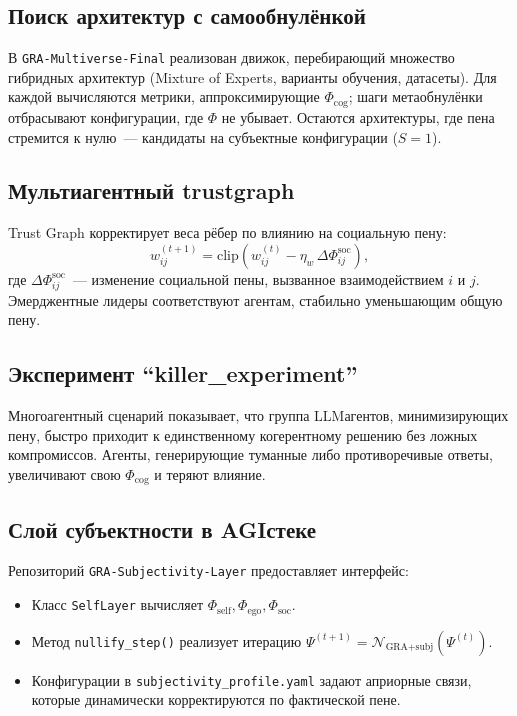 \documentclass[11pt,a4paper]{article}
\begin{document}
\subsection{Поиск архитектур с самообнулёнкой}

В \texttt{GRA-Multiverse-Final} реализован движок, перебирающий множество гибридных архитектур (Mixture of Experts, варианты обучения, датасеты).
Для каждой вычисляются метрики, аппроксимирующие $\Phi_{\text{cog}}$; шаги мета\textendash обнулёнки отбрасывают конфигурации, где $\Phi$ не убывает.
Остаются архитектуры, где пена стремится к нулю~--- кандидаты на субъектные конфигурации ($S=1$).

\subsection{Мультиагентный trust\textendash graph}

Trust Graph корректирует веса рёбер по влиянию на социальную пену:
\begin{equation}
w_{ij}^{(t+1)} = \text{clip}\left(w_{ij}^{(t)} - \eta_w\,\Delta\Phi^{\text{soc}}_{ij}\right),
\end{equation}
где $\Delta\Phi^{\text{soc}}_{ij}$~--- изменение социальной пены, вызванное взаимодействием $i$ и $j$.
Эмерджентные лидеры соответствуют агентам, стабильно уменьшающим общую пену.

\subsection{Эксперимент ``killer\_experiment''}

Многоагентный сценарий показывает, что группа LLM\textendash агентов, минимизирующих пену, быстро приходит к единственному когерентному решению без ложных компромиссов.
Агенты, генерирующие туманные либо противоречивые ответы, увеличивают свою $\Phi_{\text{cog}}$ и теряют влияние.

\subsection{Слой субъектности в AGI\textendash стеке}

Репозиторий \texttt{GRA-Subjectivity-Layer} предоставляет интерфейс:
\begin{itemize}
\item Класс \texttt{SelfLayer} вычисляет $\Phi_{\text{self}}, \Phi_{\text{ego}}, \Phi_{\text{soc}}$.
\item Метод \texttt{nullify\_step()} реализует итерацию $\Psi^{(t+1)} = \mathcal{N}_{\text{GRA+subj}}(\Psi^{(t)})$.
\item Конфигурации в \texttt{subjectivity\_profile.yaml} задают априорные связи, которые динамически корректируются по фактической пене.
\end{itemize}
\end{document}
